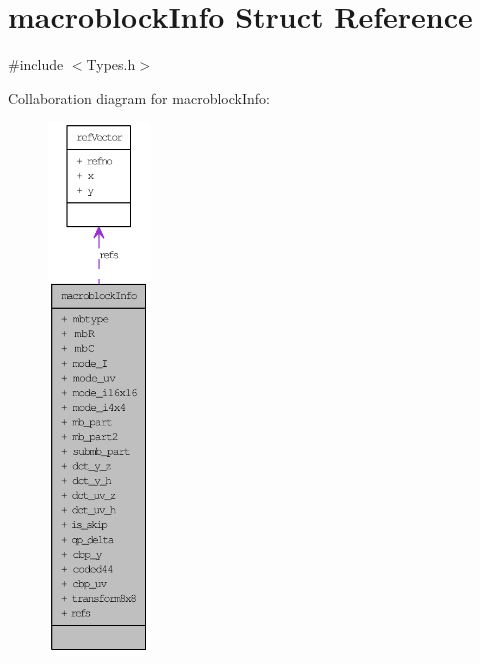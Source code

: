 \hypertarget{structmacroblock_info}{
\section{macroblockInfo Struct Reference}
\label{structmacroblock_info}
}


{\ttfamily \#include $<$Types.h$>$}



Collaboration diagram for macroblockInfo:\nopagebreak
\begin{figure}[H]
\begin{center}
\leavevmode
\includegraphics[height=400pt]{structmacroblock_info__coll__graph}
\end{center}
\end{figure}
